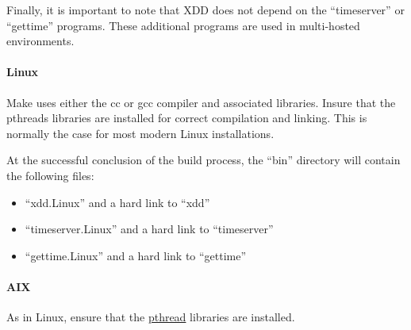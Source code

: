 Finally, it is important to note that XDD does not depend on the ``timeserver'' or ``gettime'' programs. These additional programs are used in multi-hosted environments.

\paragraph{Linux}\label{linux}

Make uses either the cc or gcc compiler and associated libraries. Insure that the pthreads libraries are installed for correct compilation and linking. This is normally the case for most modern Linux installations.

At the successful conclusion of the build process, the ``bin'' directory will contain the following files:

\begin{itemize}
\item
  ``xdd.Linux'' and a hard link to ``xdd''
\item
  ``timeserver.Linux'' and a hard link to ``timeserver''
\item
  ``gettime.Linux'' and a hard link to ``gettime''
\end{itemize}

\paragraph{AIX}\label{aix}

As in Linux, ensure that the \ul{pthread} libraries are installed.

